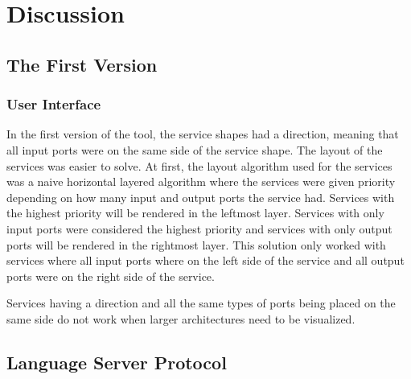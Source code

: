 \chapter{Discussion}

\section{The First Version}

\subsection{User Interface}
In the first version of the tool, the service shapes had a direction, meaning that all input ports were on the same side of the service shape. The layout of the services was easier to solve.
At first, the layout algorithm used for the services was a naive horizontal layered algorithm where the services were given priority depending on how many input and output ports the service had.
Services with the highest priority will be rendered in the leftmost layer. Services with only input ports were considered the highest priority and services with only output ports will be rendered in the rightmost layer.
This solution only worked with services where all input ports where on the left side of the service and all output ports were on the right side of the service.

Services having a direction and all the same types of ports being placed on the same side do not work when larger architectures need to be visualized.

\section{Language Server Protocol}